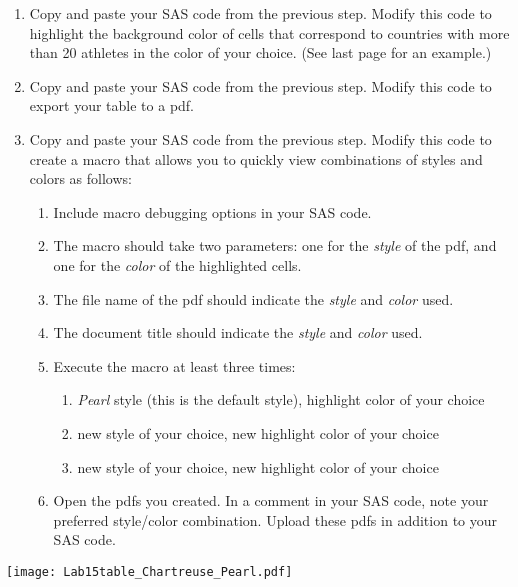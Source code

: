 \begin{enumerate}
\item Copy and paste your SAS code from the previous step.  Modify this code to highlight the background color of cells that correspond to countries with more than 20 athletes in the color of your choice.  (See last page for an example.)
\item Copy and paste your SAS code from the previous step.  Modify this code to export your table to a pdf.
\item Copy and paste your SAS code from the previous step.  Modify this code to create a macro that allows you to quickly view combinations of styles and colors as follows:
\begin{enumerate}
\item Include macro debugging options in your SAS code.
\item The macro should take two parameters: one for the \emph{style} of the pdf, and one for the \emph{color} of the highlighted cells.
\item The file name  of the pdf should indicate the \emph{style} and \emph{color} used.
\item The document title should indicate the \emph{style} and \emph{color} used.
\item Execute the macro at least three times:
\begin{enumerate}
\item \emph{Pearl} style (this is the default style), highlight color of your choice
\item new style of your choice, new highlight color of your choice
\item new style of your choice, new highlight color of your choice
\end{enumerate}
\item Open the pdfs you created.  In a comment in your SAS code, note your preferred style/color combination.  Upload these pdfs in addition to your SAS code.
\end{enumerate}
\end{enumerate}
\newpage
\texttt{[image: Lab15table\_Chartreuse\_Pearl.pdf]}
 